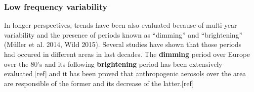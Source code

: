 

\subsubsection{Low frequency variability}

In longer perspectives, trends have been also evaluated because of multi-year variability and the presence of periods known as “dimming” and “brightening” (Müller et al. 2014, Wild 2015). Several studies have shown that those periods had occured in different areas in last decades. The \textbf{dimming} period over Europe over the 80's and its following \textbf{brightening} period has been extensively evaluated [ref] and it has been proved that anthropogenic aerosols over the area are responsible of the former and its decrease of the latter.[ref]
 
